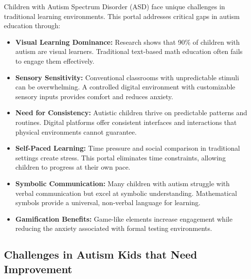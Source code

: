 \documentclass[12pt, a4paper]{article}
\begin{document}
Children with Autism Spectrum Disorder (ASD) face unique challenges in traditional learning environments. This portal addresses critical gaps in autism education through:

\begin{itemize}[leftmargin=*, itemsep=10pt]
    \item \textbf{Visual Learning Dominance:} Research shows that 90\% of children with autism are visual learners. Traditional text-based math education often fails to engage them effectively.
    
    \item \textbf{Sensory Sensitivity:} Conventional classrooms with unpredictable stimuli can be overwhelming. A controlled digital environment with customizable sensory inputs provides comfort and reduces anxiety.
    
    \item \textbf{Need for Consistency:} Autistic children thrive on predictable patterns and routines. Digital platforms offer consistent interfaces and interactions that physical environments cannot guarantee.
    
    \item \textbf{Self-Paced Learning:} Time pressure and social comparison in traditional settings create stress. This portal eliminates time constraints, allowing children to progress at their own pace.
    
    \item \textbf{Symbolic Communication:} Many children with autism struggle with verbal communication but excel at symbolic understanding. Mathematical symbols provide a universal, non-verbal language for learning.
    
    \item \textbf{Gamification Benefits:} Game-like elements increase engagement while reducing the anxiety associated with formal testing environments.
\end{itemize}

\subsection{Challenges in Autism Kids that Need Improvement}
\end{document}
